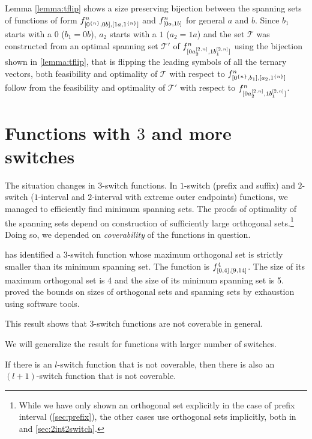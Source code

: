 Lemma \ref{lemma:tflip} shows
a size preserving
bijection
between
the spanning sets of functions of form
$f^{n}_{[0^{\{n\}}, 0 b], [1 a, 1^{\{n\}}]}$
and $f^{n}_{[0 a, 1 b]}$
for general $a$ and $b$.
Since $b_1$ starts with a $0$ ($b_1 = 0 b$),
$a_2$ starts with a $1$ ($a_2 = 1 a$)
and the set $\mathcal{T}$ was constructed
from an optimal spanning set $\mathcal{T}'$
of
$f^{n}_{[0 a_2^{[2, n]}, 1 b_1^{[2, n]}]}$
using the bijection
shown in \ref{lemma:tflip},
that is flipping the leading symbols
of all the ternary vectors,
both feasibility and optimality of $\mathcal{T}$
with respect to $f^{n}_{[0^{\{n\}}, b_1], [a_2, 1^{\{n\}}]}$
follow from the feasibility and optimality
of $\mathcal{T}'$ with respect to
$f^{n}_{[0 a_2^{[2, n]}, 1 b_1^{[2, n]}]}$.

\section{Functions with \texorpdfstring{$3$}{3}
and more switches}
\label{sec:3switch}

The situation changes in $3$-switch functions.
In $1$-switch (prefix and suffix)
and $2$-switch ($1$-interval and $2$-interval
with extreme outer endpoints)
functions,
we managed to efficiently find minimum spanning sets.
The proofs of optimality of the spanning sets
depend on construction of sufficiently large
orthogonal sets.\footnote{While we have only shown
an orthogonal set explicitly
in the case of prefix interval (\autoref{sec:prefix}),
the other cases use orthogonal sets implicitly,
both in \citep{Schieber2005154}
and \autoref{sec:2int2switch}.}
Doing so, we depended on \emph{coverability}
of the functions in question.

\citeauthor{Dubovsky2012} has identified
a $3$-switch function
whose maximum orthogonal set is strictly smaller than its
minimum spanning set.
The function is
$f^4_{[0, 4], [9, 14]}$.
The size of its maximum orthogonal set is 4
and the size of its minimum spanning set is
5.\citep[p.~32]{Dubovsky2012}
\citeauthor{Dubovsky2012} proved the bounds
on sizes of orthogonal sets and spanning sets
by exhaustion using software tools.

This result shows that $3$-switch functions
are not coverable in general.

We will generalize the result for functions
with larger number of switches.

\begin{lemma}
If there is an $l$-switch function that is not coverable,
then there is also an $(l+1)$-switch function
that is not coverable.
\end{lemma}

